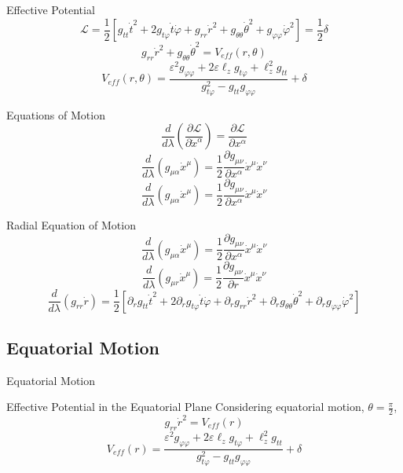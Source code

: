 \documentclass{beamer}
\begin{document}
\begin{frame}{Effective Potential}
	$$ \mathcal{L} =\frac{1}{2} \left[ g_{tt} \dot{t}^2 + 2g_{t \varphi} \dot{t} \dot{\varphi} + g_{rr} \dot{r}^2 + g_{\theta \theta} \dot{\theta}^2 + g_{\varphi \varphi} \dot{\varphi}^2 \right] = \frac{1}{2} \delta$$
	\pause
	\[ g_{rr} \dot{r}^2 + g_{\theta \theta} \dot{\theta}^2 = V_{eff} (r, \theta) \]
	\pause
	\[ V_{eff} (r,\theta) = \frac{\varepsilon^2 g_{\varphi \varphi} + 2 \varepsilon \ell_z g_{t\varphi} + \ell_z^2 g_{tt} }{g_{t\varphi}^2-g_{tt} g_{\varphi\varphi}} + \delta \]
\end{frame}


\begin{frame}{Equations of Motion}
	$$\frac{d}{d\lambda} \left( \frac{\partial \mathcal{L}}{\partial \dot{x}^\alpha} \right) = \frac{\partial \mathcal{L}}{\partial x^\alpha} $$ 
	\pause
	$$\frac{d}{d\lambda} \left(  g_{\mu\alpha} \dot{x}^\mu \right) =  \frac{1}{2} \frac{\partial g_{\mu\nu}}{\partial x^\alpha} \dot{x}^\mu \dot{x}^\nu$$ 
	\pause
	$$\frac{d}{d\lambda} \left( g_{\mu\alpha} \dot{x}^\mu \right) =  \frac{1}{2} \frac{\partial g_{\mu\nu}}{\partial x^\alpha} \dot{x}^\mu \dot{x}^\nu$$ 
\end{frame}


\begin{frame}{Radial Equation of Motion}
	$$\frac{d}{d\lambda} \left( g_{\mu\alpha} \dot{x}^\mu \right) =  \frac{1}{2} \frac{\partial g_{\mu\nu}}{\partial x^\alpha} \dot{x}^\mu \dot{x}^\nu$$ 
	\pause
	$$\frac{d}{d\lambda} \left( g_{\mu r} \dot{x}^\mu \right) =  \frac{1}{2} \frac{\partial g_{\mu\nu}}{\partial r} \dot{x}^\mu \dot{x}^\nu$$
	\pause
	$$\frac{d}{d\lambda} \left( g_{rr} \dot{r} \right) =  \frac{1}{2} \left[ \partial_r g_{tt} \dot{t}^2 + 2\partial_r g_{t \varphi} \dot{t} \dot{\varphi} + \partial_r g_{rr} \dot{r}^2 + \partial_r g_{\theta \theta} \dot{\theta}^2 + \partial_r g_{\varphi \varphi} \dot{\varphi}^2 \right]$$
\end{frame}

\subsection{Equatorial Motion}
\begin{frame}
	\huge
    Equatorial Motion
\end{frame}

\begin{frame}{Effective Potential in the Equatorial Plane}
	Considering equatorial motion, $ \theta = \frac{\pi}{2} $, 
	\pause
	\[ g_{rr} \dot{r}^2 = V_{eff} (r) \]
	\pause
	\[ V_{eff} (r) = \frac{\varepsilon^2 g_{\varphi \varphi} + 2 \varepsilon \ell_z g_{t\varphi} + \ell_z^2 g_{tt} }{g_{t\varphi}^2-g_{tt} g_{\varphi\varphi}} + \delta \]
\end{frame}
\end{document}
